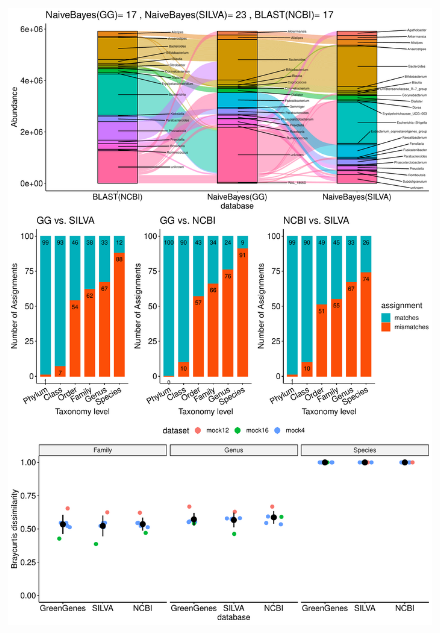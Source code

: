 \documentclass[letterpaper,12pt]{article}
\providecommand{\DIFaddbeginFL}{} %
\providecommand{\DIFaddendFL}{} %
\providecommand{\DIFdelbeginFL}{} %
\providecommand{\DIFdelendFL}{} %
\newcommand{\DIFscaledelfig}{0.5}
\newlength{\DIFdelgraphicswidth} %
\newlength{\DIFdelgraphicsheight} %
\newcommand{\DIFaddincludegraphics}[2][]{{\color{blue}\fbox{\DIFOincludegraphics[#1]{#2}}}} %
\newcommand{\DIFdelincludegraphics}[2][]{%
\sbox{\DIFdelgraphicsbox}{\DIFOincludegraphics[#1]{#2}}%
\settoboxwidth{\DIFdelgraphicswidth}{\DIFdelgraphicsbox} %
\settoboxtotalheight{\DIFdelgraphicsheight}{\DIFdelgraphicsbox} %
\scalebox{\DIFscaledelfig}{%
\parbox[b]{\DIFdelgraphicswidth}{\usebox{\DIFdelgraphicsbox}\\[-\baselineskip] \rule{\DIFdelgraphicswidth}{0em}}\llap{\resizebox{\DIFdelgraphicswidth}{\DIFdelgraphicsheight}{%
\setlength{\unitlength}{\DIFdelgraphicswidth}%
\begin{picture}(1,1)%
\thicklines\linethickness{2pt} %
{\color[rgb]{1,0,0}\put(0,0){\framebox(1,1){}}}%
{\color[rgb]{1,0,0}\put(0,0){\line( 1,1){1}}}%
{\color[rgb]{1,0,0}\put(0,1){\line(1,-1){1}}}%
\end{picture}%
}\hspace*{3pt}}} %
} %
\DeclareRobustCommand{\DIFaddbeginFL}{\DIFOaddbeginFL \let\includegraphics\DIFaddincludegraphics} %
\DeclareRobustCommand{\DIFaddendFL}{\DIFOaddendFL \let\includegraphics\DIFOincludegraphics} %
\DeclareRobustCommand{\DIFdelbeginFL}{\DIFOdelbeginFL \let\includegraphics\DIFdelincludegraphics} %
\DeclareRobustCommand{\DIFdelendFL}{\DIFOaddendFL \let\includegraphics\DIFOincludegraphics} %
\begin{document}
  \begin{figure}[H]
    \centering
    \DIFdelbeginFL %
\DIFdelendFL \DIFaddbeginFL \includegraphics[width=\textwidth,height=1.2\textwidth]{figure4.pdf}
  \DIFaddendFL \end{figure}
\end{document}
